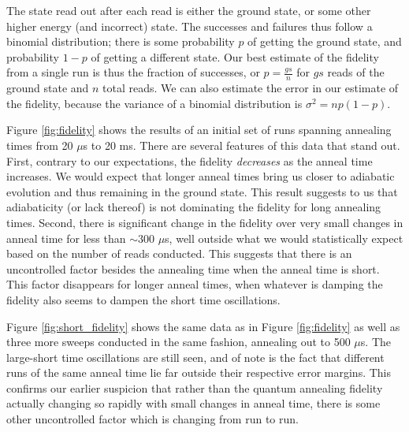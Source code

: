 The state read out after each read is either the ground state, or some other higher energy (and incorrect) state.  The successes and failures thus follow a binomial distribution; there is some probability $p$ of getting the ground state, and probability $1-p$ of getting a different state.
Our best estimate of the fidelity from a single run is thus the fraction of successes, or $p = \frac{gs}{n}$ for $gs$ reads of the ground state and $n$ total reads.  We can also estimate the error in our estimate of the fidelity, because the variance of a binomial distribution is $\sigma^2 = np(1-p)$.

Figure \ref{fig:fidelity} shows the results of an initial set of runs spanning annealing times from 20 $\mu$s to 20 ms.  
There are several features of this data that stand out.  
First, contrary to our expectations, the fidelity \emph{decreases} as the anneal time increases.  We would expect that longer anneal times bring us closer to adiabatic evolution and thus remaining in the ground state.  This result suggests to us that adiabaticity (or lack thereof) is not dominating the fidelity for long annealing times. 
Second, there is significant change in the fidelity over very small changes in anneal time for less than $\sim 300$ $\mu$s, well outside what we would statistically expect based on the number of reads conducted.  This suggests that there is an uncontrolled factor besides the annealing time when the anneal time is short.  This factor disappears for longer anneal times, when whatever is damping the fidelity also seems to dampen the short time oscillations.

Figure \ref{fig:short_fidelity} shows the same data as in Figure \ref{fig:fidelity} as well as three more sweeps conducted in the same fashion, annealing out to 500 $\mu$s.  The large-short time oscillations are still seen, and of note is the fact that different runs of the same anneal time lie far outside their respective error margins.  This confirms our earlier suspicion that rather than the quantum annealing fidelity actually changing so rapidly with small changes in anneal time, there is some other uncontrolled factor which is changing from run to run.

